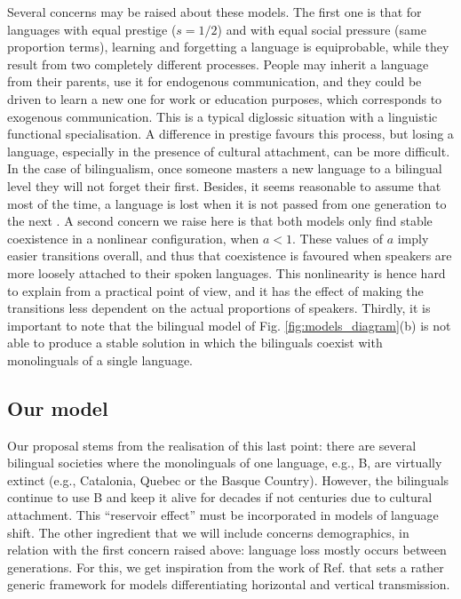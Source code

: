 \documentclass[../thesis.tex]{subfiles}
\begin{document}
Several concerns may be raised about these models. The first one is that for languages
with equal prestige ($s=1/2$) and with equal social pressure (same proportion terms),
learning and forgetting a language is equiprobable, while they result from two
completely different processes. People may inherit a language from their parents, use it
for endogenous communication, and they could be driven to learn a new one for work or
education purposes, which corresponds to exogenous communication. This is a typical
diglossic situation \cite{FergusonDiglossia1959} with a linguistic functional
specialisation. A difference in prestige favours this process, but losing a language,
especially in the presence of cultural attachment, can be more difficult. In the case of
bilingualism, once someone masters a new language to a bilingual level they will not
forget their first. Besides, it seems reasonable to assume that most of the time, a
language is lost when it is not passed from one generation to the next
\cite{CrystalLanguageDeath2000,PortesPluribusUnum1998}. A second concern we raise here
is that both models only find stable coexistence in a nonlinear configuration, when $a <
1$. These values of $a$ imply easier transitions overall, and thus that coexistence is
favoured when speakers are more loosely attached to their spoken languages. This
nonlinearity is hence hard to explain from a practical point of view, and it has the
effect of making the transitions less dependent on the actual proportions of speakers.
Thirdly, it is important to note that the bilingual model of Fig.
\cref{fig:models_diagram}(b) is not able to produce a stable solution in which the
bilinguals coexist with monolinguals of a single language.


\subsection{Our model}
Our proposal stems from the realisation of this last point: there are several bilingual
societies where the monolinguals of one language, e.g., B, are virtually extinct (e.g.,
Catalonia, Quebec or the Basque Country). However, the bilinguals continue to use B and
keep it alive for decades if not centuries due to cultural attachment. This ``reservoir
effect'' must be incorporated in models of language shift. The other ingredient that we
will include concerns demographics, in relation with the first concern raised above:
language loss mostly occurs between generations. For this, we get inspiration from the
work of Ref. \cite{MinettModellingEndangered2008} that sets a rather generic framework
for models differentiating horizontal and vertical transmission.
\end{document}
